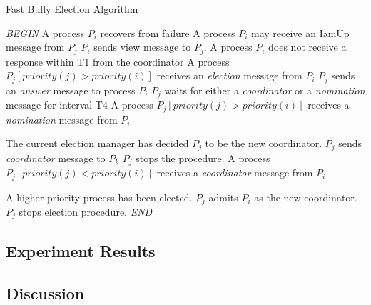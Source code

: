 \documentclass[dareport.tex]{subfiles}
\begin{document}
\begin{algorithm}[h]
	\caption{Fast Bully Election Algorithm}
	\label{fast-bully-algorithm}
	\begin{algorithmic}[1]
		\BState \emph{BEGIN}
		\State A process $P_{i}$ recovers from failure
			\State\indent{}
		\State A process $P_{i}$ may receive an IamUp message from $P_{j}$
			\State\indent $P_{i}$ sends view message to $P_{j}$.
		\State A process $P_{i}$ does not receive a response within T1 from the coordinator
			\State\indent{}
		\State A process $P_{j} \left[priority(j) > priority(i)\right]$ receives an \emph{election} message from $P_{i}$
			\State\indent $P_{j}$ sends an \emph{answer} message to process $P_{i}$
			\State\indent $P_{j}$ waits for either a \emph{coordinator} or a \emph{nomination} message for interval T4
				\State{}
			\Else
			\EndIf
			\State A process $P_{j} \left[priority(j) > priority(i)\right]$ receives a \emph{nomination} message from $P_{i}$
			
			\Comment The current election manager has decided $P_{j}$ to be the new coordinator.
				\State $P_{j}$ sends \emph{coordinator} message to $P_{k}$
				\State $P_{j}$ stops the procedure.
			\EndFor
			\State A process $P_{j} \left[priority(j) < priority(i)\right]$ receives a \emph{coordinator} message from $P_{i}$
			
			\Comment A higher priority process has been elected.
			\State\indent $P_{j}$ admits $P_{i}$ as the new coordinator.
			\State\indent $P_{j}$ stops election procedure.
		\BState \emph{END}
	\end{algorithmic}
\end{algorithm}
\subsection{Experiment Results}
\subsection{Discussion}
\end{document}
